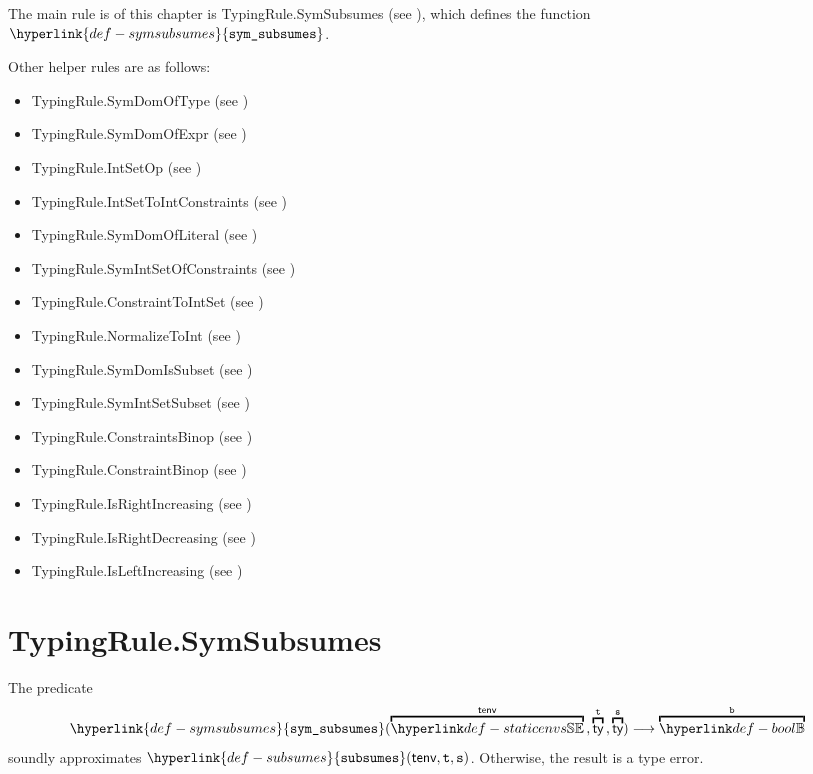 \documentclass{book}
\newcommand\subsumes[0]{\hyperlink{def-subsumes}{\texttt{subsumes}}}
\newcommand\symsubsumes[0]{\hyperlink{def-symsubsumes}{\texttt{sym\_subsumes}}}
\newcommand\vt[0]{\texttt{t}}
\newcommand\vs[0]{\texttt{s}}
\begin{document}
The main rule is of this chapter is TypingRule.SymSubsumes (see ), which defines the function
$\symsubsumes$.

Other helper rules are as follows:
\begin{itemize}
  \item TypingRule.SymDomOfType (see )
  \item TypingRule.SymDomOfExpr (see )
  \item TypingRule.IntSetOp (see )
  \item TypingRule.IntSetToIntConstraints (see )
  \item TypingRule.SymDomOfLiteral (see )
  \item TypingRule.SymIntSetOfConstraints (see )
  \item TypingRule.ConstraintToIntSet (see )
  \item TypingRule.NormalizeToInt (see )
  \item TypingRule.SymDomIsSubset (see )
  \item TypingRule.SymIntSetSubset (see )
  \item TypingRule.ConstraintsBinop (see )
  \item TypingRule.ConstraintBinop (see )
  \item TypingRule.IsRightIncreasing (see )
  \item TypingRule.IsRightDecreasing (see )
  \item TypingRule.IsLeftIncreasing (see )
\end{itemize}

\section{TypingRule.SymSubsumes \label{sec:TypingRule.SymSubsumes}}
\hypertarget{def-symsubsumes}{}
The predicate
\[
  \symsubsumes(\overname{\staticenvs}{\tenv} \aslsep \overname{\ty}{\vt} \aslsep \overname{\ty}{\vs})
  \aslto \overname{\Bool}{\vb}
\]
soundly approximates $\subsumes(\tenv, \vt, \vs)$.
Otherwise, the result is a type error.
\end{document}
